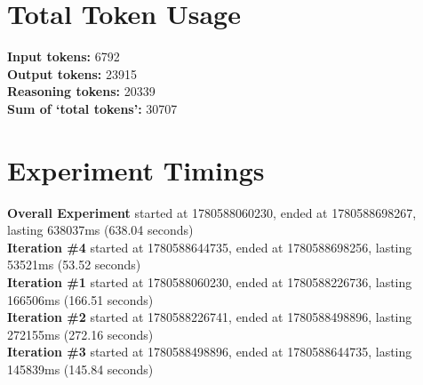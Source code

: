 \documentclass{article}
\begin{document}
\section*{Total Token Usage}
\textbf{Input tokens: }6792
\\\textbf{Output tokens: }23915
\\\textbf{Reasoning tokens: }20339
\\\textbf{Sum of `total tokens': }30707
\section*{Experiment Timings}
\textbf{Overall Experiment} started at 1780588060230, ended at 1780588698267, lasting 638037ms (638.04 seconds)
\\\textbf{Iteration \#4} started at 1780588644735, ended at 1780588698256, lasting 53521ms (53.52 seconds)
\\\textbf{Iteration \#1} started at 1780588060230, ended at 1780588226736, lasting 166506ms (166.51 seconds)
\\\textbf{Iteration \#2} started at 1780588226741, ended at 1780588498896, lasting 272155ms (272.16 seconds)
\\\textbf{Iteration \#3} started at 1780588498896, ended at 1780588644735, lasting 145839ms (145.84 seconds)
\end{document}

